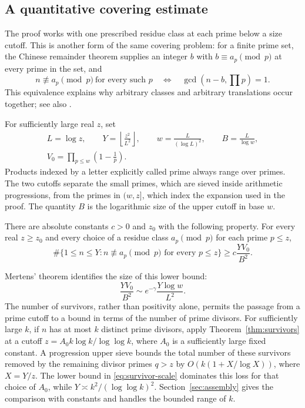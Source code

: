 \subsection*{A quantitative covering estimate}

The proof works with one prescribed residue class at each prime below
a size cutoff. This is another form of the same covering problem:
for a finite prime set, the Chinese remainder theorem supplies an
integer $b$ with $b\equiv a_p\pmod p$ at every prime in the set, and
\[
 n\not\equiv a_p\pmod p\ \text{for every such }p
 \quad\Longleftrightarrow\quad
 \gcd\left(n-b,\prod p\right)=1.
\]
This equivalence explains why arbitrary classes and arbitrary
translations occur together; see also
\cite[Lemma~2.1]{HajduSaradha2012}.

For sufficiently large real $z$, set
\begin{equation}\label{eq:parameters}
\begin{gathered}
 L=\log z,\qquad Y=\left\lfloor\frac{z^2}{L^2}\right\rfloor,
 \qquad w=\frac{L}{(\log L)^2},\qquad B=\frac{L}{\log w},\\
 V_0=\prod_{p\le w}\left(1-\frac1p\right).
\end{gathered}
\end{equation}
Products indexed by a letter explicitly called prime always range over
primes. The two cutoffs separate the small primes, which are sieved
inside arithmetic progressions, from the primes in $(w,z]$, which
index the expansion used in the proof. The quantity $B$ is the
logarithmic size of the upper cutoff in base $w$.

\begin{theorem}\label{thm:survivors}
There are absolute constants $c>0$ and $z_0$ with the following property.
For every real $z\ge z_0$ and every choice of a residue class
$a_p\pmod p$ for each prime $p\le z$,
\begin{equation}\label{eq:main-survivors}
 \#\{1\le n\le Y:n\not\equiv a_p\pmod p\text{ for every }p\le z\}
 \ge c\frac{YV_0}{B^2}.
\end{equation}
\end{theorem}

Mertens' theorem identifies the size of this lower bound:
\begin{equation}\label{eq:survivor-scale}
 \frac{YV_0}{B^2}\sim e^{-\gamma}\frac{Y\log w}{L^2}.
\end{equation}
The number of survivors, rather than positivity alone, permits the
passage from a prime cutoff to a bound in terms of the number of prime
divisors. For sufficiently large $k$, if $n$ has at most $k$ distinct
prime divisors, apply
Theorem~\ref{thm:survivors} at a cutoff
$z=A_0 k\log k/\log\log k$, where $A_0$ is a sufficiently large fixed
constant. A progression upper sieve bounds the total number of these
survivors removed by the remaining divisor primes $q>z$ by
$O(k(1+X/\log X))$, where $X=Y/z$.
The lower bound in \eqref{eq:survivor-scale} dominates this loss for
that choice of $A_0$, while $Y\asymp k^2/(\log\log k)^2$.
Section~\ref{sec:assembly} gives the comparison with constants and
handles the bounded range of $k$.

